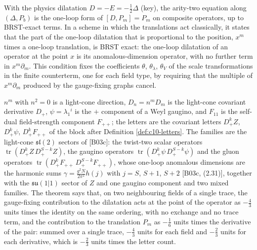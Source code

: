 \begin{remark}
With the physics dilatation $D=-E=-\tfrac12\Delta$ (key), the arity-two equation along $(\Delta,P_b)$ is the one-loop form of $[D,P_m]=P_m$ on composite operators, up to BRST-exact terms. In a scheme in which the translations act classically, it states that the part of the one-loop dilatation that is proportional to the position, $x^m$ times a one-loop translation, is BRST exact: the one-loop dilatation of an operator at the point $x$ is its anomalous-dimension operator, with no further term in $x^m\partial_m$. This condition fixes the coefficients $\theta$, $\theta_\lambda$, $\theta_V$ of the scale transformations in the finite counterterm, one for each field type, by requiring that the multiple of $x^m\partial_m$ produced by the gauge-fixing graphs cancel.
\end{remark}

\begin{remark}
$n^m$ with $n^2=0$ is a light-cone direction, $D_n=n^mD_m$ is the light-cone covariant derivative $D_+$, $\psi=\lambda_1{}^i$ is the $+$ component of a Weyl gaugino, and $F_{11}$ is the self-dual field-strength component $F_{++}$; the letters are the covariant letters $D_+^kZ$, $D_+^k\psi$, $D_+^kF_{++}$ of the block after Definition \ref{def:c10-letters}. The families are the light-cone $\mathfrak{sl}(2)$ sectors of [B03c]: the twist-two scalar operators $\operatorname{tr}(D_+^kZ\,D_+^{S-k}Z)$, the gaugino operators $\operatorname{tr}(D_+^k\psi\,D_+^{S-k}\psi)$ and the gluon operators $\operatorname{tr}(D_+^kF_{++}\,D_+^{S-k}F_{++})$, whose one-loop anomalous dimensions are the harmonic sums $\gamma=\frac{g^2N}{2\pi^2}h(j)$ with $j=S$, $S+1$, $S+2$ [B03c, (2.31)], together with the $\mathfrak{su}(1|1)$ sector of $Z$ and one gaugino component and two mixed families. The theorem says that, on two neighbouring fields of a single trace, the gauge-fixing contribution to the dilatation acts at the point of the operator as $-\tfrac43$ units times the identity on the same ordering, with no exchange and no trace term, and the contribution to the translation $P_m$ as $-\tfrac16$ units times the derivative of the pair: summed over a single trace, $-\tfrac43$ units for each field and $-\tfrac23$ units for each derivative, which is $-\tfrac23$ units times the letter count.
\end{remark}

